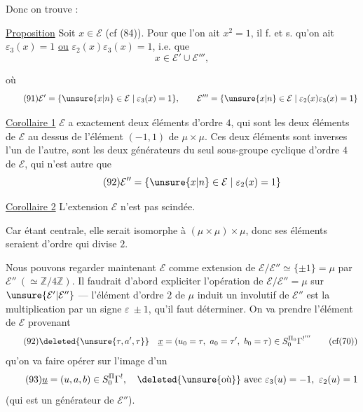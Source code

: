 Donc on trouve :

\uline{Proposition} Soit $x\in\mathcal E$ (cf (84)). Pour que
l'on ait $x^2=1$, il f. et s. qu'on ait
$\varepsilon_3(x)=1$ \uline{ou} $\varepsilon_2(x)\varepsilon_3(x)=1$,
i.e. que
\[
\tag{90}
x\in\mathcal E'\cup\mathcal E''',
\]



où
\[
\tag{91}
\mathcal E'=\{\unsure{x|n}\in\mathcal E\mid\varepsilon_3(x)=1\},\qquad
\mathcal E'''=\{\unsure{x|n}\in\mathcal E\mid\varepsilon_2(x)\varepsilon_3(x)=1\}
\]

\uline{Corollaire 1} $\mathcal E$ a exactement deux éléments
d'ordre $4$, qui sont les deux éléments de $\mathcal E$ au
dessus de l'élément $(-1,1)$ de $\mu\times\mu$.
Ces deux éléments sont inverses l'un de
l'autre,  sont les deux générateurs du
seul sous-groupe cyclique d'ordre $4$ de $\mathcal E$,
qui n'est autre que
\[
\tag{92}
\mathcal E''=\{\unsure{x|n}\in\mathcal E\mid\varepsilon_2(x)=1\}
\]

\uline{Corollaire 2} L'extension $\mathcal E$ n'est pas scindée.

Car étant centrale, elle  serait isomorphe
à $(\mu\times\mu)\times\mu$, donc ses éléments seraient d'ordre
qui divise $2$.

Nous pouvons regarder maintenant
$\mathcal E$ comme extension de $\mathcal E/\mathcal E''\simeq\{\pm1\}=\mu$ par
$\mathcal E''\ (\simeq\mathbb Z/4\mathbb Z)$.
 Il faudrait
d'abord expliciter l'opération de $\mathcal E/\mathcal E''=\mu$
sur $\unsure{\mathcal E'|\mathcal E''}$ --- l'élément  d'ordre $2$ de $\mu$
induit un  involutif de  $\mathcal E''$
 est la multiplication par un
signe $\varepsilon\ \pm1$, qu'il faut déterminer. On va
prendre 
l'élément de $\mathcal E$ provenant
\[
\tag{92}
\deleted{\unsure{\tau,a',\tau}}\quad
\underline x=(u_0=\tau,\ a_0=\tau',\ b_0=\tau)
\in S_0^{\Pi_0}\Gamma^{!'''}\qquad(\text{cf}(70))
\]
qu'on va faire opérer sur l'image d'un
\[
\tag{93}
\underline u=(u,a,b)\in S_0^{\Pi}\Gamma^{!},\quad
\deleted{\unsure{\text{où}}}\ \text{avec }\varepsilon_3(u)=-1,\ \varepsilon_2(u)=1
\]
(qui est un générateur de $\mathcal E''$).

